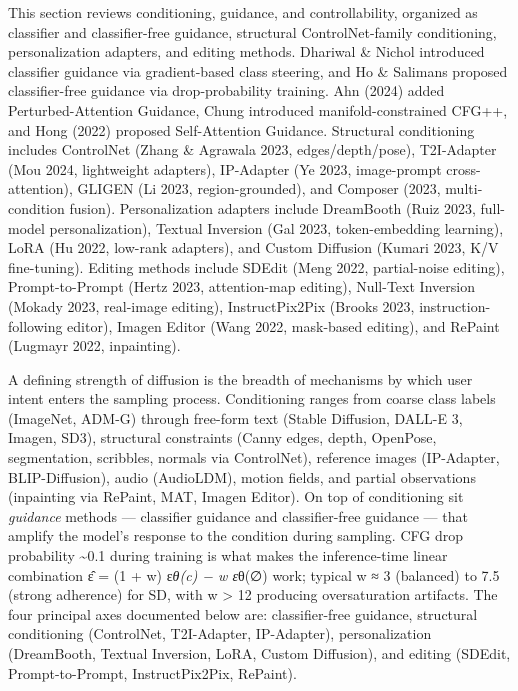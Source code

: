 \documentclass{article}
\begin{document}
This section reviews conditioning, guidance, and controllability, organized as classifier and classifier-free guidance, structural ControlNet-family conditioning, personalization adapters, and editing methods. Dhariwal \& Nichol \citet{nichol2021improveddenoisingd} introduced classifier guidance via gradient-based class steering, and Ho \& Salimans \citet{salimans2022progressivedistill} proposed classifier-free guidance via drop-probability training. Ahn (2024) added Perturbed-Attention Guidance, Chung \citet{chung2023diffusionposterior} introduced manifold-constrained CFG++, and Hong (2022) proposed Self-Attention Guidance. Structural conditioning includes ControlNet (Zhang \& Agrawala 2023, edges/depth/pose), T2I-Adapter (Mou 2024, lightweight adapters), IP-Adapter (Ye 2023, image-prompt cross-attention), GLIGEN (Li 2023, region-grounded), and Composer (2023, multi-condition fusion). Personalization adapters include DreamBooth (Ruiz 2023, full-model personalization), Textual Inversion (Gal 2023, token-embedding learning), LoRA (Hu 2022, low-rank adapters), and Custom Diffusion (Kumari 2023, K/V fine-tuning). Editing methods include SDEdit (Meng 2022, partial-noise editing), Prompt-to-Prompt (Hertz 2023, attention-map editing), Null-Text Inversion (Mokady 2023, real-image editing), InstructPix2Pix (Brooks 2023, instruction-following editor), Imagen Editor (Wang 2022, mask-based editing), and RePaint (Lugmayr 2022, inpainting).

A defining strength of diffusion is the breadth of mechanisms by which user intent enters the sampling process. Conditioning ranges from coarse class labels (ImageNet, ADM-G) through free-form text (Stable Diffusion, DALL-E 3, Imagen, SD3), structural constraints (Canny edges, depth, OpenPose, segmentation, scribbles, normals via ControlNet), reference images (IP-Adapter, BLIP-Diffusion), audio (AudioLDM), motion fields, and partial observations (inpainting via RePaint, MAT, Imagen Editor). On top of conditioning sit \emph{guidance} methods --- classifier guidance \citep{dhariwal2021diffusionmodelsbea} and classifier-free guidance \citep{ho2022classifierfreediff} --- that amplify the model's response to the condition during sampling. CFG drop probability \textasciitilde0.1 during training is what makes the inference-time linear combination ε̂ = (1 + w) ε\emph{θ(c) − w ε}θ(∅) work; typical w ≈ 3 (balanced) to 7.5 (strong adherence) for SD, with w \textgreater{} 12 producing oversaturation artifacts. The four principal axes documented below are: classifier-free guidance, structural conditioning (ControlNet, T2I-Adapter, IP-Adapter), personalization (DreamBooth, Textual Inversion, LoRA, Custom Diffusion), and editing (SDEdit, Prompt-to-Prompt, InstructPix2Pix, RePaint).
\end{document}
